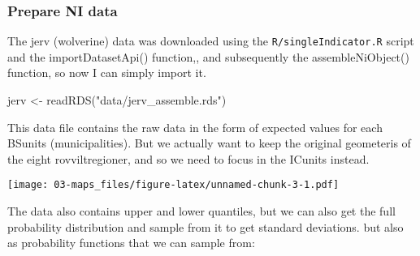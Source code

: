 \documentclass[
]{book}
\newenvironment{Shaded}{\begin{snugshade}}{\end{snugshade}}
\newcommand{\AttributeTok}[1]{\textcolor[rgb]{0.77,0.63,0.00}{#1}}
\newcommand{\DecValTok}[1]{\textcolor[rgb]{0.00,0.00,0.81}{#1}}
\newcommand{\FunctionTok}[1]{\textcolor[rgb]{0.00,0.00,0.00}{#1}}
\newcommand{\NormalTok}[1]{#1}
\newcommand{\OtherTok}[1]{\textcolor[rgb]{0.56,0.35,0.01}{#1}}
\newcommand{\SpecialCharTok}[1]{\textcolor[rgb]{0.00,0.00,0.00}{#1}}
\newcommand{\StringTok}[1]{\textcolor[rgb]{0.31,0.60,0.02}{#1}}
\begin{document}
\hypertarget{prepare-ni-data}{%
\subsubsection{Prepare NI data}\label{prepare-ni-data}}

The jerv (wolverine) data was downloaded using the \texttt{R/singleIndicator.R} script and the importDatasetApi() function,, and subsequently the assembleNiObject() function, so now I can simply import it.

\begin{Shaded}
\begin{Highlighting}[]
\NormalTok{jerv }\OtherTok{\textless{}{-}} \FunctionTok{readRDS}\NormalTok{(}\StringTok{"data/jerv\_assemble.rds"}\NormalTok{)}
\end{Highlighting}
\end{Shaded}

This data file contains the raw data in the form of expected values for each BSunits (municipalities). But we actually want to keep the original geometeris of the eight rovviltregioner, and so we need to focus in the ICunits instead.

\begin{Shaded}
\end{Shaded}

\texttt{[image: 03-maps\_files/figure-latex/unnamed-chunk-3-1.pdf]}

The data also contains upper and lower quantiles, but we can also get the full probability distribution and sample from it to get standard deviations.
but also as probability functions that we can sample from:
\end{document}
